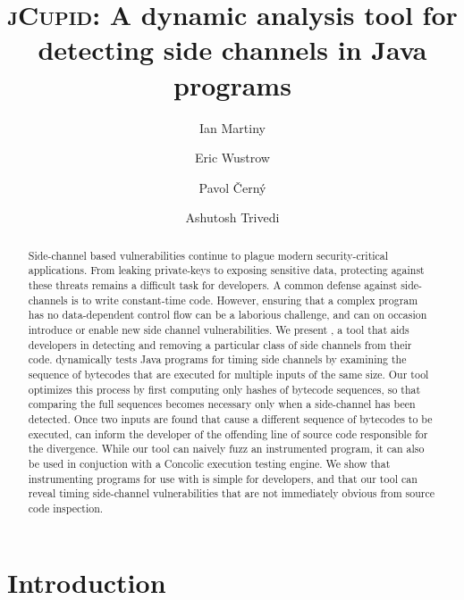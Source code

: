 \documentclass{llncs}
\begin{document}
\title{\textsc{jCupid}: A dynamic analysis tool for detecting side channels in Java programs}
\author{
  Ian Martiny
  \and
  Eric Wustrow
  \and
  Pavol {\v C}ern\'y
  \and
  Ashutosh Trivedi
}


\maketitle

\begin{abstract}
  Side-channel based vulnerabilities continue to plague modern security-critical
  applications.
  From leaking private-keys to exposing sensitive data, 
  protecting against these threats remains a difficult task for developers. 
  A common defense against side-channels is to write constant-time code.
  However, ensuring that a complex program has no data-dependent control flow
  can be a laborious challenge, and can on occasion introduce or enable new side
  channel vulnerabilities.
  We present \jcupid, a tool that aids developers in detecting and
  removing a particular class of side channels from their code.
  \jcupid dynamically tests Java programs for timing side channels by examining
  the sequence of bytecodes that are executed for multiple inputs of the same size.
  Our tool optimizes this process by first computing only hashes of bytecode sequences,
  so that comparing the full sequences becomes necessary only when a side-channel has been detected.
  Once two inputs are found that cause a different sequence of bytecodes to be
  executed, \jcupid can inform the developer of the offending line of source code
  responsible for the divergence.
  While our tool can naively fuzz an instrumented program, it can also be used
  in conjuction with a Concolic execution testing engine.
  We show that instrumenting programs for use with \jcupid is simple for
  developers, and that our tool can reveal timing side-channel vulnerabilities
  that are not immediately obvious from source code inspection.
\end{abstract}



\section{Introduction}
\label{sec:introduction}

\end{document}
